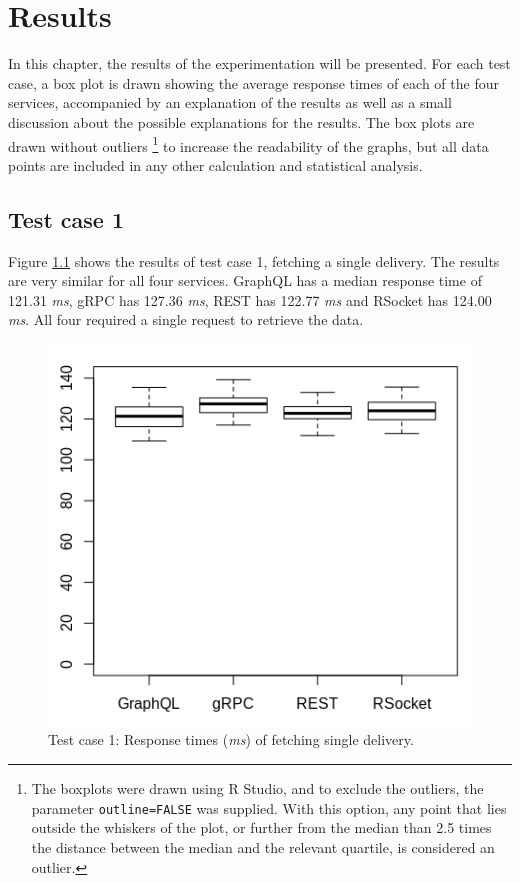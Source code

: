 \chapter{Results} \label{sec:results}
In this chapter, the results of the experimentation will be presented. For each test case, a box plot is drawn showing the average response times of each of the four services, accompanied by an explanation of the results as well as a small discussion about the possible explanations for the results. The box plots are drawn without outliers \footnote{The boxplots were drawn using R Studio, and to exclude the outliers, the parameter \texttt{outline=FALSE} was supplied. With this option, any point that lies outside the whiskers of the plot, or further from the median than 2.5 times the distance between the median and the relevant quartile, is considered an outlier.} to increase the readability of the graphs, but all data points are included in any other calculation and statistical analysis.

\section{Test case 1}
Figure \ref{fig:stagger_1} shows the results of test case 1, fetching a single delivery. The results are very similar for all four services. GraphQL has a median response time of 121.31 \textit{ms}, gRPC has 127.36 \textit{ms}, REST has 122.77 \textit{ms} and RSocket has 124.00 \textit{ms}. All four required a single request to retrieve the data.

\begin{figure}[ht!]
    \centerline{\includegraphics[scale=0.7]{thesis_svava/images/stagger1new.png}}
    \caption{Test case 1: Response times (\textit{ms}) of fetching single delivery.}
    \label{fig:stagger_1}
\end{figure}

